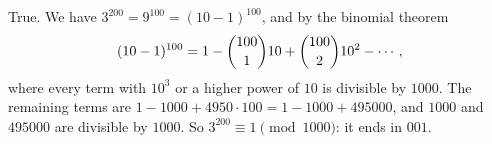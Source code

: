 True. We have $3^{200}=9^{100}=(10-1)^{100}$, and by the binomial theorem
\[(10-1)^{100}=1-\dbinom{100}{1}10+\dbinom{100}{2}10^2-\cdots,\]
where every term with $10^3$ or a higher power of $10$ is divisible by $1000$. The remaining terms are $1-1000+4950\cdot100=1-1000+495000$, and $1000$ and $495000$ are divisible by $1000$. So $3^{200}\equiv1\pmod{1000}$: it ends in $\boxed{001}$.
